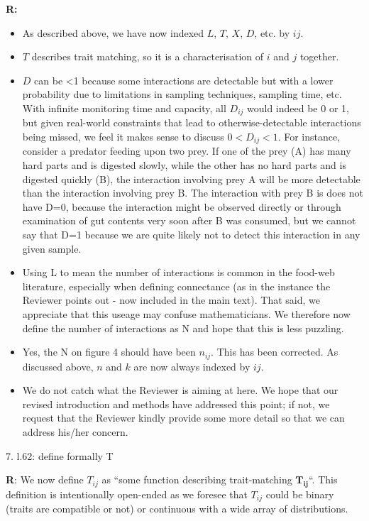 \documentclass[12pt]{letter}
\begin{document}
		\textbf{R:} 
			\begin{itemize}
				\item As described above, we have now indexed $L$, $T$, $X$, $D$, etc. by $ij$. 
				\item $T$ describes trait matching, so it is a characterisation of $i$ and $j$ together. 
				\item $D$ can be \textless1 because some interactions are detectable but with a lower probability due to limitations in sampling techniques, sampling time, etc. With infinite monitoring time and capacity, all $D_{ij}$ would indeed be 0 or 1, but given real-world constraints that lead to otherwise-detectable interactions being missed, we feel it makes sense to discuss $0<D_{ij}<1$. For instance, consider a predator feeding upon two prey. If one of the prey (A) has many hard parts and is digested slowly, while the other has no hard parts and is digested quickly (B), the interaction involving prey A will be more detectable than the interaction involving prey B. The interaction with prey B is does not have D=0, because the interaction might be observed directly or through examination of gut contents very soon after B was consumed, but we cannot say that D=1 because we are quite likely not to detect this interaction in any given sample. 
				\item Using L to mean the number of interactions is common in the food-web literature, especially when defining connectance (as in the instance the Reviewer points out - now included in the main text). That said, we appreciate that this useage may confuse mathematicians. We therefore now define the number of interactions as N and hope that this is less puzzling.
				\item Yes, the N on figure 4 should have been $n_{ij}$. This has been corrected. As discussed above, $n$ and $k$ are now always indexed by $ij$. 
				\item We do not catch what the Reviewer is aiming at here. We hope that our revised introduction and methods have addressed this point; if not, we request that the Reviewer kindly provide some more detail so that we can address his/her concern.
			\end{itemize}


	7. l.62: define formally T


		\textbf{R}: We now define $T_{ij}$ as ``some function describing trait-matching $\mathbf{T_{ij}}$``. This definition is intentionally open-ended as we foresee that $T_{ij}$ could be binary (traits are compatible or not) or continuous with a wide array of distributions.
\end{document}
